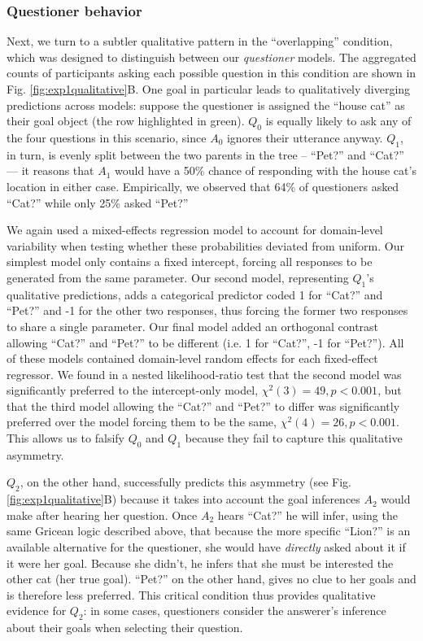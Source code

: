 \documentclass[11pt, floatsintext]{apa6}
\begin{document}
\subsubsection{Questioner behavior}
Next, we turn to a subtler qualitative pattern in the ``overlapping'' condition, which was designed to distinguish between our \emph{questioner} models. 
The aggregated counts of participants asking each possible question in this condition are shown in Fig. \ref{fig:exp1qualitative}B. 
One goal in particular leads to qualitatively diverging predictions across models: suppose the questioner is assigned the ``house cat'' as their goal object (the row highlighted in green). 
$Q_0$ is equally likely to ask any of the four questions in this scenario, since $A_0$ ignores their utterance anyway. 
$Q_1$, in turn, is evenly split between the two parents in the tree -- ``Pet?'' and ``Cat?'' --- it reasons that $A_1$ would have a 50\% chance of responding with the house cat's location in either case. 
Empirically, we observed that 64\% of questioners asked ``Cat?'' while only 25\% asked ``Pet?''

We again used a mixed-effects regression model to account for domain-level variability when testing whether these probabilities deviated from uniform.
Our simplest model only contains a fixed intercept, forcing all responses to be generated from the same parameter.
Our second model, representing $Q_1$'s qualitative predictions, adds a categorical predictor coded 1 for ``Cat?'' and ``Pet?'' and -1 for the other two responses, thus forcing the former two responses to share a single parameter.
Our final model added an orthogonal contrast allowing ``Cat?'' and ``Pet?'' to be different (i.e. 1 for ``Cat?'', -1 for ``Pet?''). 
All of these models contained domain-level random effects for each fixed-effect regressor.
We found in a nested likelihood-ratio test that the second model was significantly preferred to the intercept-only model, $\chi^2(3) = 49, p < 0.001$, but that the third model allowing the ``Cat?'' and ``Pet?'' to differ was significantly preferred over the model forcing them to be the same, $\chi^2(4) = 26, p < 0.001$.
This allows us to falsify $Q_0$ and $Q_1$ because they fail to capture this qualitative asymmetry.

$Q_2$, on the other hand, successfully predicts this asymmetry (see Fig. \ref{fig:exp1qualitative}B) because it takes into account the goal inferences $A_2$ would make after hearing her question. 
Once $A_2$ hears ``Cat?'' he will infer, using the same Gricean logic described above, that because the more specific ``Lion?'' is an available alternative for the questioner, she would have \emph{directly} asked about it if it were her goal. 
Because she didn't, he infers that she must be interested the other cat (her true goal). 
``Pet?'' on the other hand, gives no clue to her goals and is therefore less preferred. 
This critical condition thus provides qualitative evidence for $Q_2$: in some cases, questioners consider the answerer's inference about their goals when selecting their question. 
\end{document}
